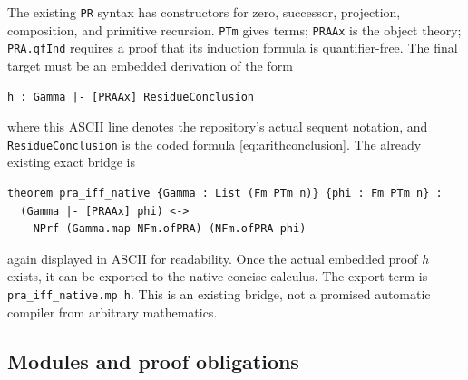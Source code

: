 \documentclass[11pt]{article}
\theoremstyle{definition}
\newcommand{\code}[1]{\texttt{#1}}
\begin{document}
The existing \code{PR} syntax has constructors for zero, successor,
projection, composition, and primitive recursion. \code{PTm} gives
terms; \code{PRAAx} is the object theory; \code{PRA.qfInd} requires a
proof that its induction formula is quantifier-free.
The final target must be an embedded derivation of the form
\begin{lstlisting}
h : Gamma |- [PRAAx] ResidueConclusion
\end{lstlisting}
where this ASCII line denotes the repository's actual sequent notation,
and \code{ResidueConclusion} is the coded formula
\eqref{eq:arithconclusion}. The already existing exact bridge is
\begin{lstlisting}
theorem pra_iff_native {Gamma : List (Fm PTm n)} {phi : Fm PTm n} :
  (Gamma |- [PRAAx] phi) <->
    NPrf (Gamma.map NFm.ofPRA) (NFm.ofPRA phi)
\end{lstlisting}
again displayed in ASCII for readability. Once the actual embedded
proof \(h\) exists, it can be exported to the native concise calculus.
The export term is \code{pra\_iff\_native.mp h}. This is an existing
bridge, not a promised automatic compiler from arbitrary mathematics.

\subsection{Modules and proof obligations}
\end{document}
